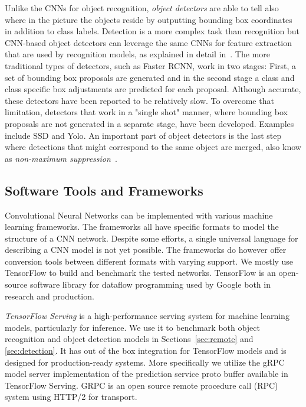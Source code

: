 \documentclass[sigconf]{acmart}
\begin{document}
Unlike the CNNs for object recognition, \textit{object detectors} are able to tell also where in the picture the objects reside by outputting bounding box coordinates in addition to class labels. Detection is a more complex task than recognition but CNN-based object detectors can leverage the same CNNs for feature extraction that are used by recognition models, as explained in detail in~\cite{Huang2017CVPR}. The more traditional types of detectors, such as Faster RCNN\cite{ren17frcnn}, work in two stages: First, a set of bounding box proposals are generated and in the second stage a class and class specific box adjustments are predicted for each proposal. Although accurate, these detectors have been reported to be relatively slow. To overcome that limitation, detectors that work in a "single shot" manner, where bounding box proposals are not generated in a separate stage, have been developed. Examples include SSD\cite{liu16ssd} and Yolo\cite{redmon16CVPR}. An important part of object detectors is the last step where detections that might correspond to the same object are merged, also know as \textit{non-maximum suppression}~\cite{HosangBS17}. 

\subsection{Software Tools and Frameworks}

Convolutional Neural Networks can be implemented with various machine learning frameworks. The frameworks all have specific formats to model the structure of a CNN network. Despite some efforts, a single universal language for describing a CNN model is not yet possible. The frameworks do however offer conversion tools between different formats with varying support. We mostly use TensorFlow to build and benchmark the tested networks. TensorFlow is an open-source software library for dataflow programming used by Google both in research and production. 

\textit{TensorFlow Serving} is a high-performance serving system for machine learning models, particularly for inference. We use it to benchmark both object recognition and object detection models in Sections~\ref{sec:remote} and \ref{sec:detection}. It has out of the box integration for TensorFlow models and is designed for production-ready systems. More specifically we utilize the gRPC model server implementation of the prediction service proto buffer available in TensorFlow Serving. GRPC is an open source remote procedure call (RPC) system using HTTP/2 for transport.
\end{document}
